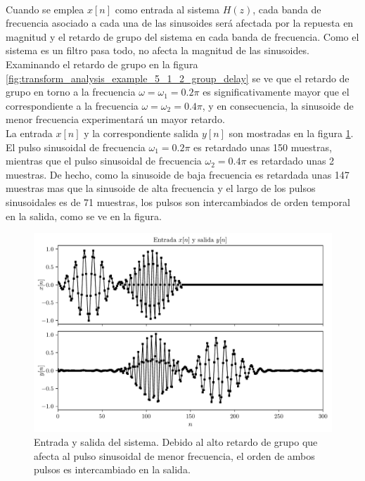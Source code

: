 \documentclass[a4paper]{report}
\begin{document}
\\
Cuando se emplea \(x[n]\) como entrada al sistema \(H(z)\), cada banda de frecuencia asociado a cada una de las sinusoides será afectada por la repuesta en magnitud y el retardo de grupo del sistema en cada banda de frecuencia. Como el sistema es un filtro pasa todo, no afecta la magnitud de las sinusoides. Examinando el retardo de grupo en la figura \ref{fig:transform_analysis_example_5_1_2_group_delay} se ve que el retardo de grupo en torno a la frecuencia \(\omega=\omega_1=0.2\pi\) es significativamente mayor que el correspondiente a la frecuencia \(\omega=\omega_2=0.4\pi\), y en consecuencia, la sinusoide de menor frecuencia experimentará un mayor retardo.
\\
La entrada \(x[n]\) y la correspondiente salida \(y[n]\) son mostradas en la figura \ref{fig:transform_analysis_example_5_1_2_group_delay_input_output}. El pulso sinusoidal de frecuencia \(\omega_1=0.2\pi\) es retardado unas 150 muestras, mientras que el pulso sinusoidal de frecuencia \(\omega_2=0.4\pi\) es retardado unas 2 muestras. De hecho, como la sinusoide de baja frecuencia es retardada unas 147 muestras mas que la sinusoide de alta frecuencia y el largo de los pulsos sinusoidales es de 71 muestras, los pulsos son intercambiados de orden temporal en la salida, como se ve en la figura.
\begin{figure}[!htb]
 \begin{center}
 \includegraphics[width=\textwidth]{figuras/transform_analysis_example_5_1_2_group_delay_input_output.pdf}
 \caption{\label{fig:transform_analysis_example_5_1_2_group_delay_input_output} Entrada y salida del sistema. Debido al alto retardo de grupo que afecta al pulso sinusoidal de menor frecuencia, el orden de ambos pulsos es intercambiado en la salida.}
 \end{center}
\end{figure}
\end{document}
